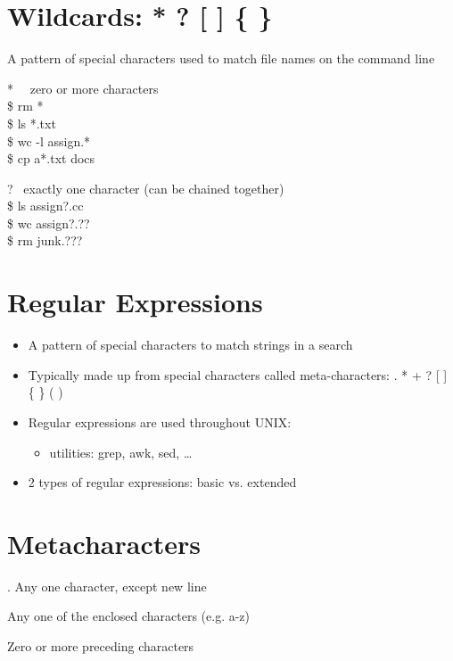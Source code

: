 \documentclass{report}
\begin{document}
\section{Wildcards: * ? [ ] \{ \}}
A pattern of special characters used to match file names on the command line
\bigbreak \noindent
\begin{minipage}{0.5\textwidth}
* \ \ zero or more characters	\\ 
\$ rm *  \\ 
\$ ls *.txt \\
\$ wc -l assign.* \\
\$ cp a*.txt docs
\end{minipage}
\begin{minipage}{0.5\textwidth}
? \ exactly one character (can be chained together)	 \\
\$ ls assign?.cc \\ 
\$ wc assign?.?? \\
\$ rm junk.???
\end{minipage}
\section{Regular Expressions}
\begin{itemize}
  \item A pattern of special characters to match strings in a search 
  \item Typically made up from special characters called meta-characters: . * + ? [ ] \{ \} ( )
  \item Regular expressions are used throughout UNIX:
    \begin{itemize}[label=$\circ$]
      \item utilities: grep, awk, sed, \ldots
    \end{itemize}
  \item 2 types of regular expressions: basic vs. extended
\end{itemize}
\section{Metacharacters}
. \hspace{10mm} Any one character, except new line \vspace{2mm}

\noindent [a-z]\hspace{6mm} Any one of the enclosed characters (e.g. a-z) \vspace{2mm}

\noindent * \hspace{10mm} Zero or more preceding characters \vspace{2mm}
\end{document}
